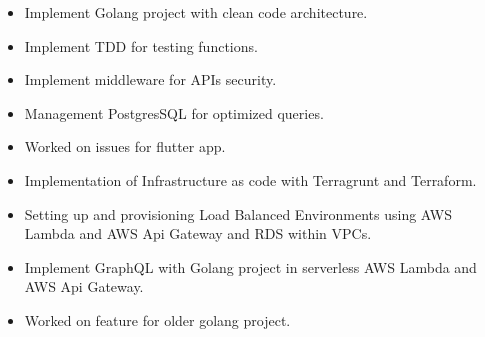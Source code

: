 
\begin{itemize}
    \item Implement Golang project with clean code architecture.
    \item Implement TDD for testing functions.
    \item Implement middleware for APIs security.
    \item Management PostgresSQL for optimized queries.
    \item Worked on issues for flutter app.
\end{itemize}

\divider

\begin{itemize}
    \item Implementation of Infrastructure as code with Terragrunt and Terraform.
    \item Setting up and provisioning Load Balanced Environments using AWS Lambda and AWS Api Gateway and RDS within VPCs.
    \item Implement GraphQL with Golang project in serverless AWS Lambda and AWS Api Gateway.
    \item Worked on feature for older golang project.
\end{itemize}

